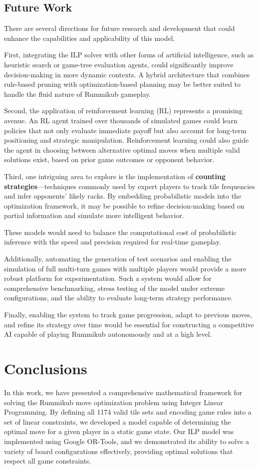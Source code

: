 \documentclass[11pt,letterpaper]{article}
\begin{document}
\subsection*{Future Work}

There are several directions for future research and development that could enhance the capabilities and applicability of this model.

First, integrating the ILP solver with other forms of artificial intelligence, such as heuristic search or game-tree evaluation agents, could significantly improve decision-making in more dynamic contexts. A hybrid architecture that combines rule-based pruning with optimization-based planning may be better suited to handle the fluid nature of Rummikub gameplay.

Second, the application of reinforcement learning (RL) represents a promising avenue. An RL agent trained over thousands of simulated games could learn policies that not only evaluate immediate payoff but also account for long-term positioning and strategic manipulation. Reinforcement learning could also guide the agent in choosing between alternative optimal moves when multiple valid solutions exist, based on prior game outcomes or opponent behavior.

Third, one intriguing area to explore is the implementation of \textbf{counting strategies}—techniques commonly used by expert players to track tile frequencies and infer opponents’ likely racks. By embedding probabilistic models into the optimization framework, it may be possible to refine decision-making based on partial information and simulate more intelligent behavior. 

These models would need to balance the computational cost of probabilistic inference with the speed and precision required for real-time gameplay.

Additionally, automating the generation of test scenarios and enabling the simulation of full multi-turn games with multiple players would provide a more robust platform for experimentation. Such a system would allow for comprehensive benchmarking, stress testing of the model under extreme configurations, and the ability to evaluate long-term strategy performance.

Finally, enabling the system to track game progression, adapt to previous moves, and refine its strategy over time would be essential for constructing a competitive AI capable of playing Rummikub autonomously and at a high level.


\section*{Conclusions}
In this work, we have presented a comprehensive mathematical framework for solving the Rummikub move optimization problem using Integer Linear Programming. By defining all 1174 valid tile sets and encoding game rules into a set of linear constraints, we developed a model capable of determining the optimal move for a given player in a static game state. Our ILP model was implemented using Google OR-Tools, and we demonstrated its ability to solve a variety of board configurations effectively, providing optimal solutions that respect all game constraints.
\end{document}
